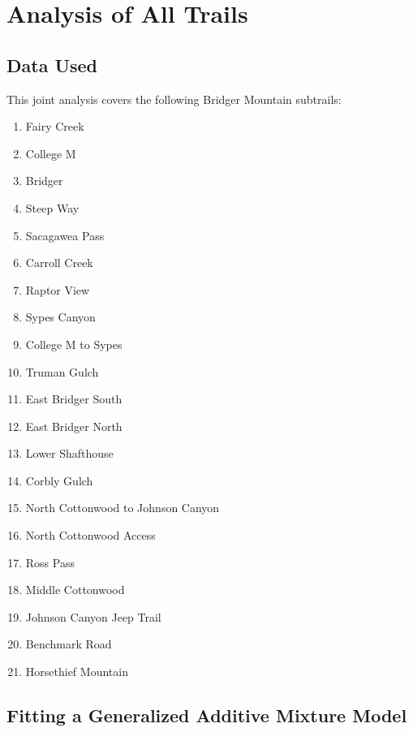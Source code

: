 \documentclass[
]{book}
\providecommand{\tightlist}{%
  \setlength{\itemsep}{0pt}\setlength{\parskip}{0pt}}
\begin{document}
\hypertarget{AllTrailsAnalysis}{%
\chapter{Analysis of All Trails}\label{AllTrailsAnalysis}}

\hypertarget{data-used-1}{%
\section{Data Used}\label{data-used-1}}

This joint analysis covers the following Bridger Mountain subtrails:

\begin{enumerate}
\def\labelenumi{\arabic{enumi}.}
\tightlist
\item
  Fairy Creek
\item
  College M
\item
  Bridger
\item
  Steep Way
\item
  Sacagawea Pass
\item
  Carroll Creek
\item
  Raptor View
\item
  Sypes Canyon
\item
  College M to Sypes
\item
  Truman Gulch
\item
  East Bridger South
\item
  East Bridger North
\item
  Lower Shafthouse
\item
  Corbly Gulch
\item
  North Cottonwood to Johnson Canyon
\item
  North Cottonwood Access
\item
  Ross Pass
\item
  Middle Cottonwood
\item
  Johnson Canyon Jeep Trail
\item
  Benchmark Road
\item
  Horsethief Mountain
\end{enumerate}

\hypertarget{fitting-a-generalized-additive-mixture-model}{%
\section{Fitting a Generalized Additive Mixture Model}\label{fitting-a-generalized-additive-mixture-model}}
\end{document}

